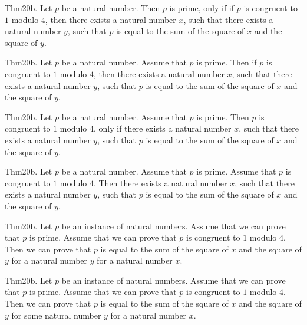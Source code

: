 \documentclass{article}
\begin{document}
Thm20b. Let $p$ be a natural number. Then $p$ is prime, only if if $p$ is congruent to $1$ modulo $4$, then there exists a natural number $x$, such that there exists a natural number $y$, such that $p$ is equal to the sum of the square of $x$ and the square of $y$.

Thm20b. Let $p$ be a natural number. Assume that $p$ is prime. Then if $p$ is congruent to $1$ modulo $4$, then there exists a natural number $x$, such that there exists a natural number $y$, such that $p$ is equal to the sum of the square of $x$ and the square of $y$.

Thm20b. Let $p$ be a natural number. Assume that $p$ is prime. Then $p$ is congruent to $1$ modulo $4$, only if there exists a natural number $x$, such that there exists a natural number $y$, such that $p$ is equal to the sum of the square of $x$ and the square of $y$.

Thm20b. Let $p$ be a natural number. Assume that $p$ is prime. Assume that $p$ is congruent to $1$ modulo $4$. Then there exists a natural number $x$, such that there exists a natural number $y$, such that $p$ is equal to the sum of the square of $x$ and the square of $y$.

Thm20b. Let $p$ be an instance of natural numbers. Assume that we can prove that $p$ is prime. Assume that we can prove that $p$ is congruent to $1$ modulo $4$. Then we can prove that $p$ is equal to the sum of the square of $x$ and the square of $y$ for a natural number $y$ for a natural number $x$.

Thm20b. Let $p$ be an instance of natural numbers. Assume that we can prove that $p$ is prime. Assume that we can prove that $p$ is congruent to $1$ modulo $4$. Then we can prove that $p$ is equal to the sum of the square of $x$ and the square of $y$ for some natural number $y$ for a natural number $x$.
\end{document}

